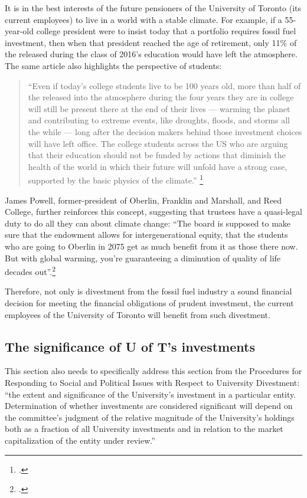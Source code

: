 It is in the best interests of the future pensioners of the University of Toronto (its current employees) to live in a world with a stable climate.
For example, if a 55-year-old college president were to insist today that a portfolio requires fossil fuel investment, then when that president reached the age of retirement,  only 11\% of the  released during the class of 2016's education would have left the atmosphere.
The same article also highlights the perspective of students: 
\begin{quote} ``Even if today's college students live to be 100 years old, more than half of the  released into the atmosphere during the four years they are in college will still be present there at the end of their lives –-- warming the planet and contributing to extreme events, like droughts, floods, and storms all the while –-- long after the decision makers behind those investment choices will have left office. The college students across the US who are arguing that their education should not be funded by actions that diminish the health of the world in which their future will unfold have a strong case, supported by the basic physics of the climate.'' \footcite{ClimateInteractivePersist}
\end{quote}
James Powell, former-president of Oberlin, Franklin and Marshall, and Reed College, further reinforces this concept, suggesting that trustees have a quasi-legal duty to do all they can about climate change: ``The board is supposed to make sure that the endowment allows for intergenerational equity, that the students who are going to Oberlin in 2075 get as much benefit from it as those there now. But with global warming, you're guaranteeing a diminution of quality of life decades out''.\footcite{CaseForDivestment}



Therefore, not only is divestment from the fossil fuel industry a sound financial decision for meeting the financial obligations of prudent investment, the current employees of the University of Toronto will benefit from such divestment.



		\subsection{The significance of U of T's investments}



\begin{vcom}
This section also needs to specifically address this section from the Procedures for Responding to Social and Political Issues with Respect to University Divestment: ``the extent and significance of the University's investment in a particular entity.  Determination of whether investments are considered significant will depend on the committee's judgment of the relative magnitude of the University's holdings both as a fraction of all University investments and in relation to the market capitalization of the entity under review.''
  

\end{vcom}




